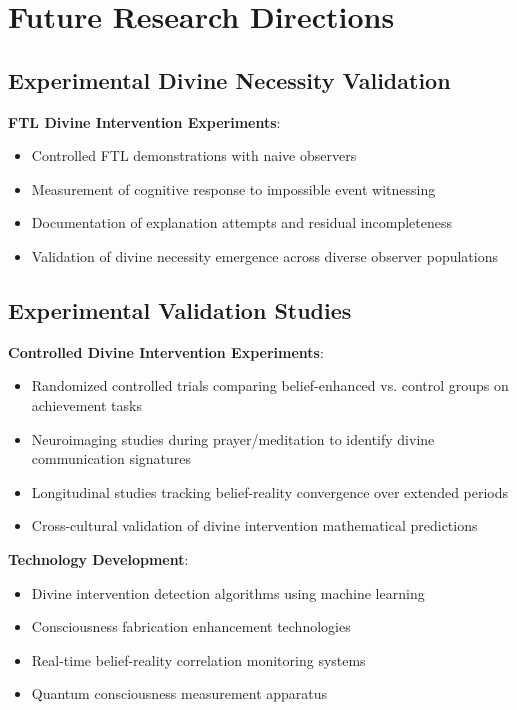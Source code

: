 \documentclass[12pt,a4paper]{article}
\begin{document}
\section{Future Research Directions}

\subsection{Experimental Divine Necessity Validation}

\textbf{FTL Divine Intervention Experiments}:
\begin{itemize}
\item Controlled FTL demonstrations with naive observers
\item Measurement of cognitive response to impossible event witnessing  
\item Documentation of explanation attempts and residual incompleteness
\item Validation of divine necessity emergence across diverse observer populations
\end{itemize}

\subsection{Experimental Validation Studies}

\textbf{Controlled Divine Intervention Experiments}:
\begin{itemize}
\item Randomized controlled trials comparing belief-enhanced vs. control groups on achievement tasks
\item Neuroimaging studies during prayer/meditation to identify divine communication signatures
\item Longitudinal studies tracking belief-reality convergence over extended periods
\item Cross-cultural validation of divine intervention mathematical predictions
\end{itemize}

\textbf{Technology Development}:
\begin{itemize}
\item Divine intervention detection algorithms using machine learning
\item Consciousness fabrication enhancement technologies
\item Real-time belief-reality correlation monitoring systems
\item Quantum consciousness measurement apparatus
\end{itemize}
\end{document}
